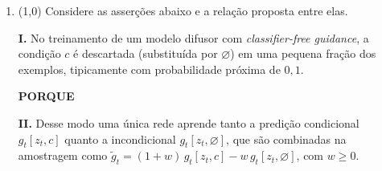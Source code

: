 \documentclass[11pt,a4paper]{article}
\begin{document}
\begin{enumerate}[1)]
\begin{enumerate}[a)]
    \item $0{,}05$ e $0{,}95$; a \textit{loss} original fornece o maior sinal de aprendizado.
    \item $0{,}95$ e $0{,}05$; a \textit{loss} original fornece o maior sinal de aprendizado.
    \item $0{,}05$ e $0{,}05$; as duas \textit{losses} saturam igualmente no início do treino.
    \item $0{,}05$ e $0{,}95$; a \textit{loss} \textit{non-saturating} fornece o maior sinal de aprendizado.
    \item $0{,}95$ e $0{,}05$; a \textit{loss} \textit{non-saturating} fornece o maior sinal de aprendizado.
    \item $0{,}0475$ e $0{,}0475$; as duas \textit{losses} fornecem exatamente o mesmo sinal.
    \item $0{,}95$ e $0{,}95$; as duas \textit{losses} fornecem sinal forte no início do treino.
    \item $0$ e $1$; apenas a \textit{loss} \textit{non-saturating} tem gradiente definido nesse ponto.
\end{enumerate}

\item (1{,}0) Considere as asserções abaixo e a relação proposta entre elas.

\textbf{I.} No treinamento de um modelo difusor com \textit{classifier-free guidance}, a condição $c$ é descartada (substituída por $\varnothing$) em uma pequena fração dos exemplos, tipicamente com probabilidade próxima de $0{,}1$.

\begin{center}\textbf{PORQUE}\end{center}

\textbf{II.} Desse modo uma única rede aprende tanto a predição condicional $g_t[z_t, c]$ quanto a incondicional $g_t[z_t, \varnothing]$, que são combinadas na amostragem como $\tilde{g}_t = (1+w)\,g_t[z_t, c] - w\,g_t[z_t, \varnothing]$, com $w \geq 0$.


\end{enumerate}
\end{document}
